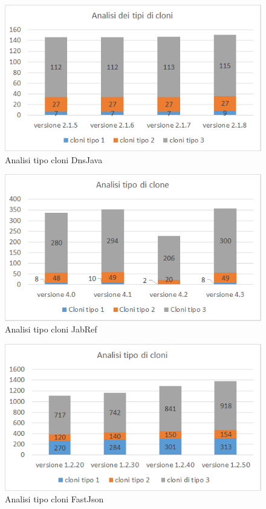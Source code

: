 \begin{figure}[h]
	\centering
	\includegraphics[scale=0.75, trim = 0cm 0cm 0cm 0cm, clip=true]{Grafici_dnsJava/TipiCloni.png}
	\caption{Analisi tipo cloni DnsJava}
	\label{fig:tipiCloniDnsJava}	
\end{figure}
\begin{figure}[h]
	\centering
	\includegraphics[scale=0.75, trim = 0cm 0cm 0cm 0cm, clip=true]{Grafici_jabRef/TipiCloni.png}
	\caption{Analisi tipo cloni JabRef}
	\label{fig:tipiCloniJabRef}
\end{figure}
\begin{figure}[h]
	\centering
	\includegraphics[scale=0.75, trim = 0cm 0cm 0cm 0cm, clip=true]{Grafici_fastJson/TipiCloni.png}
	\caption{Analisi tipo cloni FastJson}
	\label{fig:tipiCloniFastjson}
\end{figure}

